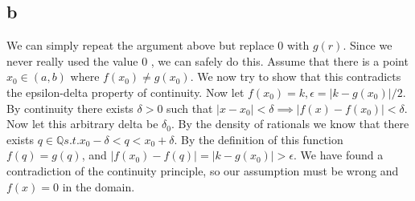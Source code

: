 \documentclass[12pt]{article}
\newcommand{\Q}{\mathbb{Q}}
\begin{document}
\subsection{b}
We can simply repeat the argument above but replace $0$ with $g(r)$. Since we never really used the value $0$ , we can safely do this.
\newline
Assume that there is a point $x_0 \in (a,b)$ where $f(x_0) \not= g(x_0)$. We now try to show that this contradicts the epsilon-delta property of continuity.
\newline
Now let $f(x_0) = k, \epsilon = |k-g(x_0)|/2$. By continuity there exists $\delta > 0$ such that $|x-x_0|<\delta \implies |f(x)-f(x_0)|<\delta$. Now let this arbitrary delta be $\delta_0$. By the density of rationals we know that there exists $q \in \Q s.t. x_0-\delta < q < x_0+\delta$. By the definition of this function $f(q)=g(q)$, and $|f(x_0)-f(q)|=|k-g(x_0)| > \epsilon$. \lightning
\newline
We have found a contradiction of the continuity principle, so our assumption must be wrong and $f(x) = 0$ in the domain.
\end{document}
